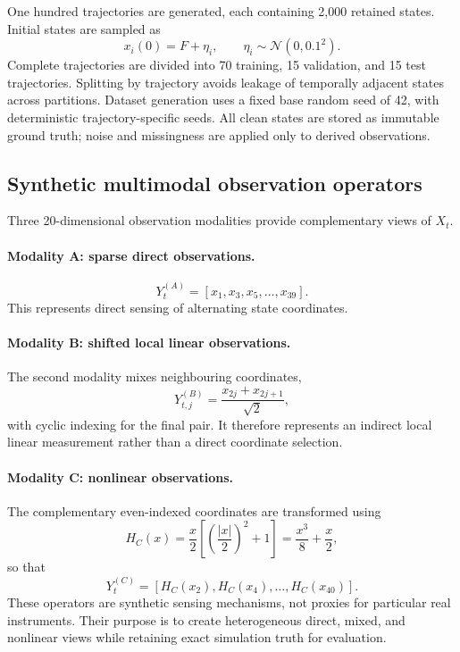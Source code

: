 \documentclass[10pt,twocolumn]{article}
\begin{document}
One hundred trajectories are generated, each containing 2,000 retained states. Initial states are sampled as
\begin{equation}
x_i(0)=F+\eta_i, \qquad \eta_i\sim\mathcal{N}(0,0.1^2).
\end{equation}
Complete trajectories are divided into 70 training, 15 validation, and 15 test trajectories. Splitting by trajectory avoids leakage of temporally adjacent states across partitions. Dataset generation uses a fixed base random seed of 42, with deterministic trajectory-specific seeds. All clean states are stored as immutable ground truth; noise and missingness are applied only to derived observations.

\subsection{Synthetic multimodal observation operators}
Three 20-dimensional observation modalities provide complementary views of $X_t$.

\paragraph{Modality A: sparse direct observations.}
\begin{equation}
Y_t^{(A)}=[x_1,x_3,x_5,\ldots,x_{39}].
\end{equation}
This represents direct sensing of alternating state coordinates.

\paragraph{Modality B: shifted local linear observations.}
The second modality mixes neighbouring coordinates,
\begin{equation}
Y_{t,j}^{(B)}=\frac{x_{2j}+x_{2j+1}}{\sqrt{2}},
\end{equation}
with cyclic indexing for the final pair. It therefore represents an indirect local linear measurement rather than a direct coordinate selection.

\paragraph{Modality C: nonlinear observations.}
The complementary even-indexed coordinates are transformed using
\begin{equation}
H_C(x)=\frac{x}{2}\left[\left(\frac{|x|}{2}\right)^2+1\right]
=\frac{x^3}{8}+\frac{x}{2},
\end{equation}
so that
\begin{equation}
Y_t^{(C)}=[H_C(x_2),H_C(x_4),\ldots,H_C(x_{40})].
\end{equation}
These operators are synthetic sensing mechanisms, not proxies for particular real instruments. Their purpose is to create heterogeneous direct, mixed, and nonlinear views while retaining exact simulation truth for evaluation.
\end{document}
